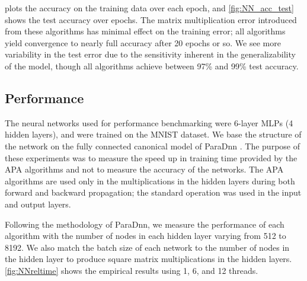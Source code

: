 \documentclass[sigconf,review,anonymous]{acmart}
\newcommand{\datafile}{}
\newcommand{\threads}{}
\begin{document}
 plots the accuracy on the training data over each epoch, and \cref{fig:NN_acc_test} shows the test accuracy over epochs. 
The matrix multiplication error introduced from these algorithms has minimal effect on the training error; all algorithms yield convergence to nearly full accuracy after 20 epochs or so.
We see more variability in the test error due to the sensitivity inherent in the generalizability of the model, though all algorithms achieve between 97\% and 99\% test accuracy.

\subsection{Performance}
\label{sec:NNperf}

\begin{figure*}[t!]
%
\subfloat[One thread]{
\centering
\renewcommand{\datafile}{data/NN_seq.dat}
\renewcommand{\threads}{1}

\label{fig:NNreltime_seq}}
%
\hfill
\subfloat[Six threads]{
\centering
\renewcommand{\datafile}{data/NN_par_6.dat}
\renewcommand{\threads}{6}

\label{fig:NNreltime_par_6}}
%
\hfill
\subfloat[Twelve threads]{
\centering
\renewcommand{\datafile}{data/NN_par_12.dat}
\renewcommand{\threads}{12}

\label{fig:NNreltime_par_12}}
%
\caption{Network training time relative to using classical matrix multiplication}
\label{fig:NNreltime}
\end{figure*}

The neural networks used for performance benchmarking were 6-layer MLPs (4 hidden layers), and were trained on the MNIST dataset. 
We base the structure of the network on the fully connected canonical model of ParaDnn \cite{WWB20}.
The purpose of these experiments was to measure the speed up in training time provided by the APA algorithms and not to measure the accuracy of the networks. 
The APA algorithms are used only in the multiplications in the hidden layers during both forward and backward propagation; the standard operation was used in the input and output layers. 

Following the methodology of ParaDnn, we measure the performance of each algorithm with the number of nodes in each hidden layer varying from 512 to 8192. 
We also match the batch size of each network to the number of nodes in the hidden layer to produce square matrix multiplications in the hidden layers. 
\cref{fig:NNreltime} shows the empirical results using 1, 6, and 12 threads.
\end{document}
